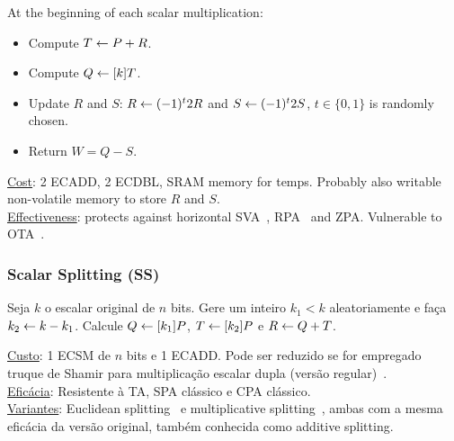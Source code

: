 At the beginning of each scalar multiplication:
\begin{itemize}
	\item Compute $T \leftarrow P + R$.
	\item Compute $Q \leftarrow [k] T$.
	\item Update $R$ and $S$: $R \leftarrow (-1)^t 2R$ and $S \leftarrow (-1)^t 2S$, $t \in \{0,1\}$ is randomly chosen.
	\item Return $W = Q - S$.
\end{itemize}

\noindent  \underline{Cost}: 2 ECADD, 2 ECDBL, SRAM memory for temps. Probably also writable non-volatile memory to store $R$ and $S$.\\
\noindent \underline{Effectiveness}: protects against horizontal SVA~\cite{MurdicaGuilley2012}, RPA~\cite{Goubin2003} and ZPA\cite{AkishitaTakagi2003}. Vulnerable to OTA~\cite{BatinaChmielewski2014}.

\subsubsection{Scalar Splitting (SS)~\cite{ClavierJoye2001}}

Seja $k$ o escalar original de $n$ bits. Gere um inteiro $k_1 < k$ aleatoriamente e faça $k_2\leftarrow k - k_1$. Calcule $Q\leftarrow [k_1]P$, $T\leftarrow[k_2]P$ e $R\leftarrow Q + T$. 

\noindent \underline{Custo}: 1 ECSM de $n$ bits e 1 ECADD. Pode ser reduzido se for empregado truque de Shamir para multiplicação escalar dupla (versão regular)~\cite{CietJoye2003}.\\
\noindent \underline{Eficácia}: Resistente à TA, SPA clássico e CPA clássico.\\
\noindent \underline{Variantes}: Euclidean splitting~\cite{CietJoye2003} e multiplicative splitting~\cite{TrichinaBelleza2003}, ambas com a mesma eficácia da versão original, também conhecida como additive splitting.

\begin{comment} %
5.	Explicar porque no contexto de PKC (RSA e ECC) não fazem sentido ataques que envolvem mais de um trace, como p.ex., DPA.
\end{comment}


